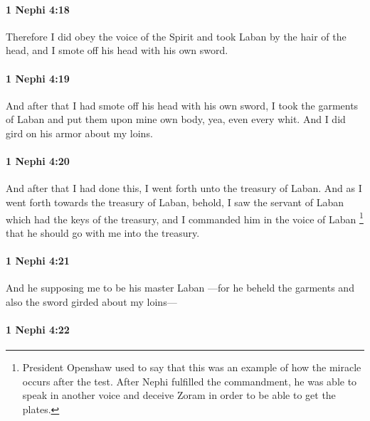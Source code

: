 		\paragraph{1 Nephi 4:18} %
			\label{1NEPHI-4-18}

			Therefore I did obey the voice of the Spirit
			and took Laban by the hair of the head,
			and I smote off his head with his own sword.

		\paragraph{1 Nephi 4:19} %
			\label{1NEPHI-4-19}

			And after that I had smote off his head with his own sword,
			I took the garments of Laban and put them
			upon mine own body, yea, even every whit.
			And I did gird on his armor about my loins.

		\paragraph{1 Nephi 4:20} %
			\label{1NEPHI-4-20}

			And after that I had done this, I went forth unto the treasury of Laban.
			And as I went forth towards the treasury of Laban,
			behold, I saw the servant of Laban which had the keys of the treasury,
			and I commanded him in the voice of Laban%
				\footnote{%
					\label{1NEPHI-4-20-NOTE-voice}%
					President Openshaw used to say that this was an example of how the miracle occurs after the test. After Nephi fulfilled the commandment, he was able to speak in another voice and deceive Zoram in order to be able to get the plates.
					}
			that he should go with me into the treasury.

		\paragraph{1 Nephi 4:21} %
			\label{1NEPHI-4-21}

			And he supposing me to be his master Laban
			---for he beheld the garments and also the sword girded about my loins---

		\paragraph{1 Nephi 4:22} %
			\label{1NEPHI-4-22}

